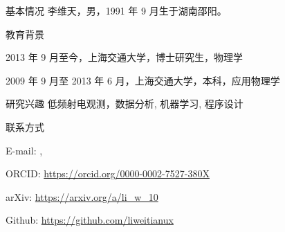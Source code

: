 
\begin{resume}
  \begin{resumesection}{基本情况}
    李维天，男，1991 年 9 月生于湖南邵阳。
  \end{resumesection}

  \begin{resumelist}{教育背景}
    \item 2013 年 9 月至今，上海交通大学，博士研究生，物理学
    \item 2009 年 9 月至 2013 年 6 月，上海交通大学，本科，应用物理学
  \end{resumelist}

  \begin{resumesection}{研究兴趣}
    低频射电观测，数据分析, 机器学习, 程序设计
  \end{resumesection}

  \begin{resumelist}{联系方式}
    \item E-mail:
      , \hspace{0.5em}
    \item ORCID: \url{https://orcid.org/0000-0002-7527-380X}
    \item arXiv: \url{https://arxiv.org/a/li_w_10}
    \item Github: \url{https://github.com/liweitianux}
  \end{resumelist}
\end{resume}
